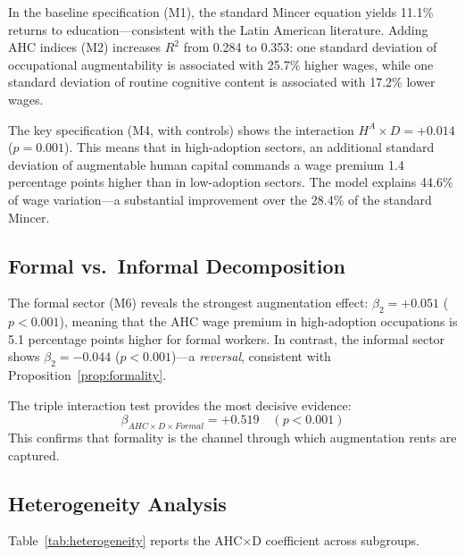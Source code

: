 \documentclass[a4paper,fleqn]{cas-dc}
\begin{document}
In the baseline specification (M1), the standard Mincer equation yields 11.1\% returns to education---consistent with the Latin American literature. Adding AHC indices (M2) increases $R^2$ from 0.284 to 0.353: one standard deviation of occupational augmentability is associated with 25.7\% higher wages, while one standard deviation of routine cognitive content is associated with 17.2\% lower wages.

The key specification (M4, with controls) shows the interaction $H^A \times D = +0.014$ ($p = 0.001$). This means that in high-adoption sectors, an additional standard deviation of augmentable human capital commands a wage premium 1.4 percentage points higher than in low-adoption sectors. The model explains 44.6\% of wage variation---a substantial improvement over the 28.4\% of the standard Mincer.

\subsection{Formal vs.\ Informal Decomposition}

The formal sector (M6) reveals the strongest augmentation effect: $\beta_2 = +0.051$ ($p < 0.001$), meaning that the AHC wage premium in high-adoption occupations is 5.1 percentage points higher for formal workers. In contrast, the informal sector shows $\beta_2 = -0.044$ ($p < 0.001$)---a \textit{reversal}, consistent with Proposition~\ref{prop:formality}.

The triple interaction test provides the most decisive evidence:
\begin{equation}
\beta_{AHC \times D \times Formal} = +0.519 \quad (p < 0.001)
\end{equation}
This confirms that formality is the channel through which augmentation rents are captured.

\subsection{Heterogeneity Analysis}

Table~\ref{tab:heterogeneity} reports the AHC$\times$D coefficient across subgroups.
\end{document}
